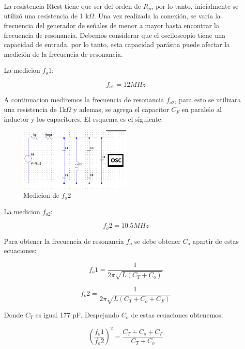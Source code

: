 La resistencia Rtest tiene que ser del orden de  $R_p$, por lo tanto, inicialmente se utilizó una resistencia de 1 k$\Omega$. Una vez realizada la conexión, se varía la frecuencia del generador 
de señales de menor a mayor hasta encontrar la frecuencia de resonancia. Debemos considerar que el osciloscopio tiene una capacidad de entrada, por lo tanto, esta capacidad parásita puede 
afectar la medición de la frecuencia de resonancia.

La medicion $f_o1$:

\begin{equation}
    f_{o1} = 12 MHz 
\end{equation}

A continuacion mediremos la frecuencia de resonancia $f_{o2}$, para esto se utilizara una resistencia de 1k$\Omega$ y ademas, se agrega el capacitor $C_F$ en paralelo al inductor y los capacitores.
El esquema es el siguiente:

\begin{figure}[h]
    \centering
    \includegraphics[width=0.5\textwidth]{Imagenes/medicion_fo2.png}
    \caption{Medicion de $f_o2$}
    \label{fig: de la frecuencia de resonancia $f_(o2)$}
\end{figure}

La medicion $f_{o2}$:

\begin{equation}
    f_o2 = 10.5 MHz
\end{equation}

Para obtener la frecuencia de resonancia $f_o$ se debe obtener $C_o$ apartir de estas ecuaciones:

\begin{equation}
    f_o1 = \frac{1}{2\pi\sqrt{L(C_T + C_o)}}
\end{equation}

\begin{equation}
    f_o2 = \frac{1}{2\pi\sqrt{L(C_T + C_o + C_F)}}
\end{equation}

Donde $C_T$ es igual 177 pF. Despejando $C_o$ de estas ecuaciones obtenemos:

\begin{equation}
    (\frac{f_o1}{f_o2})^2 = \frac{C_T + C_o + C_F}{C_T + C_o}
\end{equation}

